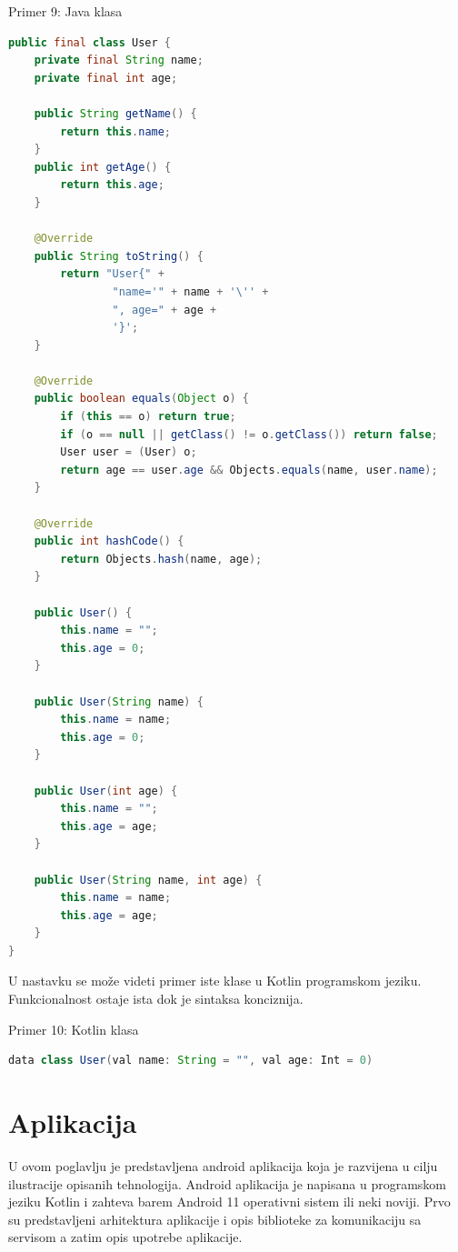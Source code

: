 \documentclass[12pt,oneside]{memoir}
\begin{document}
\begin{center} Primer 9: Java klasa\end{center}
\begin{lstlisting}[language=Java]
  public final class User {
    private final String name;
    private final int age;

    public String getName() {
        return this.name;
    }
    public int getAge() {
        return this.age;
    }

    @Override
    public String toString() {
        return "User{" +
                "name='" + name + '\'' +
                ", age=" + age +
                '}';
    }

    @Override
    public boolean equals(Object o) {
        if (this == o) return true;
        if (o == null || getClass() != o.getClass()) return false;
        User user = (User) o;
        return age == user.age && Objects.equals(name, user.name);
    }

    @Override
    public int hashCode() {
        return Objects.hash(name, age);
    }

    public User() {
        this.name = "";
        this.age = 0;
    }

    public User(String name) {
        this.name = name;
        this.age = 0;
    }

    public User(int age) {
        this.name = "";
        this.age = age;
    }

    public User(String name, int age) {
        this.name = name;
        this.age = age;
    }
}
\end{lstlisting}
U nastavku se može videti primer iste klase u Kotlin programskom jeziku. Funkcionalnost ostaje ista dok je sintaksa konciznija.
\begin{center} Primer 10: Kotlin klasa\end{center}
\begin{lstlisting}[language=Java]
data class User(val name: String = "", val age: Int = 0)
\end{lstlisting}

\section{Aplikacija}
U ovom poglavlju je predstavljena android aplikacija koja je razvijena u cilju ilustracije opisanih tehnologija. Android aplikacija je napisana u programskom jeziku Kotlin i zahteva barem Android 11 operativni sistem ili neki noviji. Prvo su predstavljeni arhitektura aplikacije i opis biblioteke za komunikaciju sa servisom a zatim opis upotrebe aplikacije.
 
\end{document}
